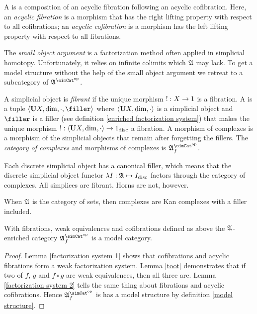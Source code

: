 \documentclass[csh.tex]{subfiles}
\begin{document}
\begin{definition} A  is a composition of an acyclic fibration following an acyclic cofibration. Here, an \emph{acyclic fibration} is a morphism that has the right lifting property with respect to all cofibrations; an \emph{acyclic cofibration} is a morphism has the left lifting property with respect to all fibrations.
\end{definition}

The \emph{small object argument} is a factorization method often applied in simplicial homotopy. Unfortunately, it relies on infinite colimits which $\mathfrak A$ may lack. To get a model structure without the help of the small object argument we retreat to a subcategory of $\ambient\s$.

\begin{definition} A simplicial object is \emph{fibrant} if the unique morphism $!: X\to 1$ is a fibration.
A  is a tuple $\tuplet{\base X,\dim,\cdot,\filler}$ where $\left\langle \mathbf{U} X,\dim,\cdot \right\rangle$ is a simplicial object and $\filler$ is a filler (see definition \ref{enriched factorization system}) that makes the unique morphism $!: \left\langle \mathbf{U} X,\dim,\cdot \right\rangle\to 1_{\rm disc}$ a fibration. A morphism of complexes is a morphism of the simplicial objects that remain after forgetting the fillers. The \emph{category of complexes} and morphisms of complexes is $\ambient\s\f$.
\end{definition}

\begin{example} Each discrete simplicial object has a canonical filler, which means that the discrete simplicial object functor $\lambda I:\mathfrak A \mapsto I_{\rm disc}$ factors through the category of complexes. All simplices are fibrant. Horns are not, however.
\end{example}

\begin{example} When $\mathfrak A$ is the category of sets, then complexes are Kan complexes with a filler included. \end{example}

\begin{theorem}
With fibrations, weak equivalences and cofibrations defined as above the $\mathfrak A$-enriched category $\ambient\s\f$ is a model category.
\label{model category}
\end{theorem}

\begin{proof}
Lemma \ref{factorization system 1} shows that cofibrations and acyclic fibrations form a weak factorization system. Lemma \ref{toot} demonstrates that if two of $f$, $g$ and $f\circ g$ are weak equivalences, then all three are. Lemma \ref{factorization system 2} tells the same thing about fibrations and acyclic cofibrations. Hence $\ambient\s\f$ is has a model structure by definition \ref{model structure}.
\end{proof}
\end{document}
